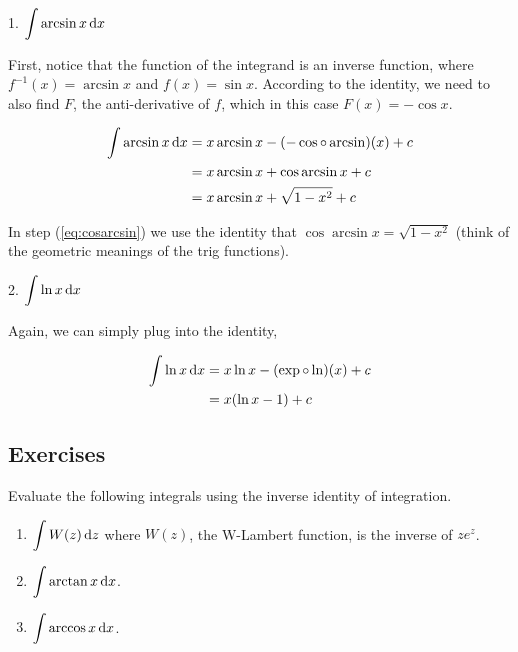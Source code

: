 1. $\displaystyle\int \arcsin x\,\textrm{d}x$

\begin{ExampleBody}
    First, notice that the function of the integrand is an inverse function, where $f^{-1}(x)=\arcsin x$ and $f(x)=\sin x$. According to the identity, we need to also find $F$, the anti-derivative of $f$, which in this case $F(x)=-\cos x$.
    
    \begin{align}
        \int \arcsin x\,\textrm{d}x &= x\arcsin x - (-\cos \circ \arcsin)(x) + c \nonumber \\
        &= x\arcsin x + \cos \arcsin x + c \nonumber \\
        &= x\arcsin x + \sqrt{1-x^2} + c \label{eq:cosarcsin}
    \end{align}
    
    In step (\ref{eq:cosarcsin}) we use the identity that $\cos \arcsin x = \sqrt{1-x^2}$ (think of the geometric meanings of the trig functions).
\end{ExampleBody}

2. $\displaystyle \int \ln x\,\textrm{d}x$

\begin{ExampleBody}
    Again, we can simply plug into the identity,
    
    \begin{align*}
        \int \ln x\,\textrm{d}x &= x\ln x - (\exp \circ \ln)(x) + c \\
        &= x(\ln x - 1) + c
    \end{align*}
\end{ExampleBody}

\subsection*{Exercises}
Evaluate the following integrals using the inverse identity of integration.

\begin{enumerate}
    \item $\displaystyle \int W(z)\,\textrm{d}z$ where $W(z)$, the W-Lambert function, is the inverse of $ze^z$.
    \item $\displaystyle \int\arctan x\,\textrm{d}x$.
    \item $\displaystyle \int \arccos x \,\textrm{d}x$.
\end{enumerate}

